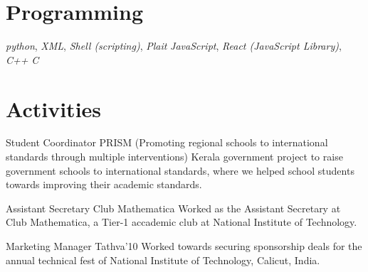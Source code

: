 \documentclass[11pt,a4paper,sans]{moderncv}
\begin{document}

\section{Programming}

           {
               \textit{python},
               \textit{XML},
               \textit{Shell (scripting)},
               \textit{Plait}
           }
           {
               \textit{JavaScript},
               \textit{React (JavaScript Library)},
               {\textit{C++}}
           }
           {\textit{C}}


\section{Activities}

            {Student Coordinator}
            {
                PRISM (Promoting regional schools to international standards
                through multiple interventions)
            }
            {}
            {}
            {
                Kerala government project to raise government schools to
                international standards, where we helped school students towards
                improving their academic standards.
            }

            {Assistant Secretary}
            {Club Mathematica}
            {}
            {}
            {
                Worked as the Assistant Secretary at Club Mathematica, a Tier-1
                accademic club at National Institute of Technology.
            }

            {Marketing Manager}
            {Tathva'10}
            {}
            {}
            {
                Worked towards securing sponsorship deals for the annual
                technical fest of National Institute of Technology, Calicut,
                India.
            }

\end{document}
